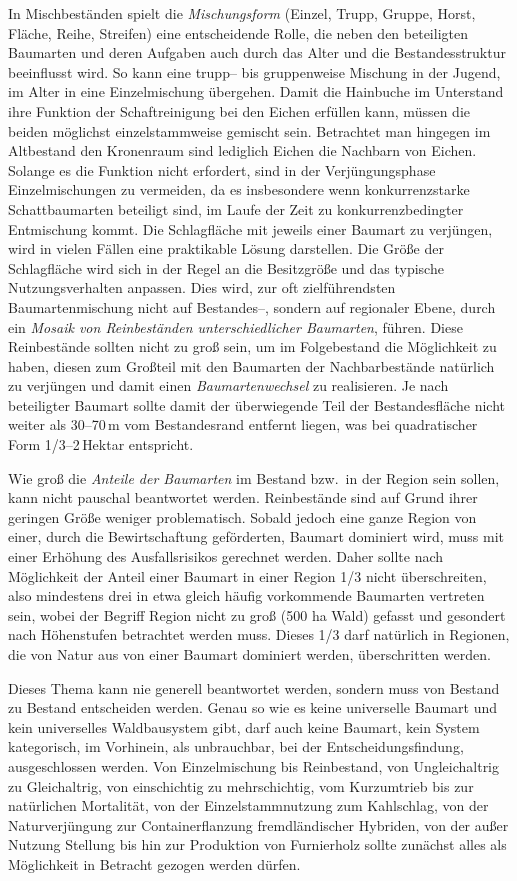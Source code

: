 \documentclass[twocolumn]{scrartcl}
\begin{document}
In Mischbeständen spielt die \emph{Mischungsform} (Einzel, Trupp,
Gruppe, Horst, Fläche, Reihe, Streifen) eine entscheidende Rolle, die
neben den beteiligten Baumarten und deren Aufgaben auch durch das
Alter und die Bestandesstruktur beeinflusst wird. So kann eine trupp--
bis gruppenweise Mischung in der Jugend, im Alter in eine
Einzelmischung übergehen. Damit die Hainbuche im Unterstand ihre
Funktion der Schaftreinigung bei den Eichen erfüllen kann, müssen
die beiden möglichst einzelstammweise gemischt sein. Betrachtet man
hingegen im Altbestand den Kronenraum sind lediglich Eichen die
Nachbarn von Eichen. Solange es die Funktion nicht erfordert, sind in
der Verjüngungsphase Einzelmischungen zu vermeiden, da es insbesondere
wenn konkurrenzstarke Schattbaumarten beteiligt sind, im Laufe der Zeit
zu konkurrenzbedingter Entmischung kommt. Die Schlagfläche mit jeweils
einer Baumart zu verjüngen, wird in vielen Fällen eine praktikable
Lösung darstellen. Die Größe der Schlagfläche wird sich in der Regel
an die Besitzgröße und das typische Nutzungsverhalten anpassen. Dies
wird, zur oft zielführendsten Baumartenmischung nicht auf Bestandes--,
sondern auf regionaler Ebene, durch ein \emph{Mosaik von Reinbeständen
  unterschiedlicher Baumarten}, führen. Diese Reinbestände sollten
nicht zu groß sein, um im Folgebestand die Möglichkeit zu haben,
diesen zum Großteil mit den Baumarten der Nachbarbestände natürlich zu
verjüngen und damit einen \emph{Baumartenwechsel} zu realisieren. Je
nach beteiligter Baumart sollte damit der überwiegende Teil der
Bestandesfläche nicht weiter als 30--70\,m vom Bestandesrand entfernt
liegen, was bei quadratischer Form 1/3--2\,Hektar entspricht.

Wie groß die \emph{Anteile der Baumarten} im Bestand bzw.\ in der
Region sein sollen, kann nicht pauschal beantwortet
werden. Reinbestände sind auf Grund ihrer geringen Größe weniger
problematisch. Sobald jedoch eine ganze Region von einer, durch die
Bewirtschaftung geförderten, Baumart dominiert wird, muss mit einer
Erhöhung des Ausfallsrisikos gerechnet werden. Daher sollte nach
Möglichkeit der Anteil einer Baumart in einer Region 1/3 nicht
überschreiten, also mindestens drei in etwa gleich häufig vorkommende
Baumarten vertreten sein, wobei der Begriff Region nicht zu groß (500
ha Wald) gefasst und gesondert nach Höhenstufen betrachtet werden
muss. Dieses 1/3 darf natürlich in Regionen, die von Natur aus von
einer Baumart dominiert werden, überschritten werden.

Dieses Thema kann nie generell beantwortet werden, sondern muss von
Bestand zu Bestand entscheiden werden. Genau so wie es keine
universelle Baumart und kein universelles Waldbausystem gibt, darf
auch keine Baumart, kein System kategorisch, im Vorhinein, als
unbrauchbar, bei der Entscheidungsfindung, ausgeschlossen werden. Von
Einzelmischung bis Reinbestand, von Ungleichaltrig zu Gleichaltrig,
von einschichtig zu mehrschichtig, vom Kurzumtrieb bis zur natürlichen
Mortalität, von der Einzelstammnutzung zum Kahlschlag, von der
Naturverjüngung zur Containerflanzung fremdländischer Hybriden, von
der außer Nutzung Stellung bis hin zur Produktion von Furnierholz
sollte zunächst alles als Möglichkeit in Betracht gezogen werden
dürfen.




\end{document}
